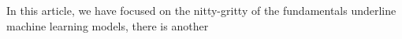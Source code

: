 In this article, we have focused on the nitty-gritty of the fundamentals underline machine learning models, there is another 